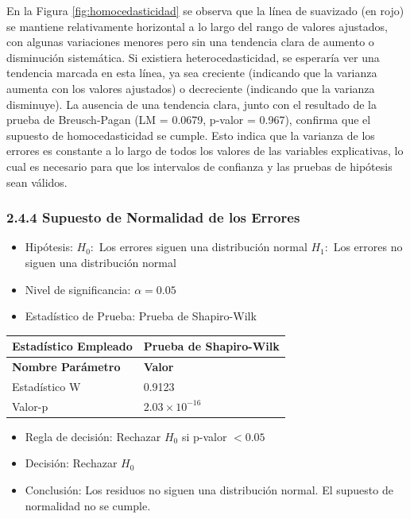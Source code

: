 \documentclass[12pt,a4paper]{article}
\begin{document}
En la Figura \ref{fig:homocedasticidad} se observa que la línea de suavizado (en rojo) se mantiene relativamente horizontal a lo largo del rango de valores ajustados, con algunas variaciones menores pero sin una tendencia clara de aumento o disminución sistemática. Si existiera heterocedasticidad, se esperaría ver una tendencia marcada en esta línea, ya sea creciente (indicando que la varianza aumenta con los valores ajustados) o decreciente (indicando que la varianza disminuye). La ausencia de una tendencia clara, junto con el resultado de la prueba de Breusch-Pagan (LM = 0.0679, p-valor = 0.967), confirma que el supuesto de homocedasticidad se cumple. Esto indica que la varianza de los errores es constante a lo largo de todos los valores de las variables explicativas, lo cual es necesario para que los intervalos de confianza y las pruebas de hipótesis sean válidos.

\subsubsection*{2.4.4 Supuesto de Normalidad de los Errores}

\begin{itemize}
    \item Hipótesis: \quad $H_0:$ Los errores siguen una distribución normal \hspace{2cm} $H_1:$ Los errores no siguen una distribución normal
    \item Nivel de significancia: $\alpha = 0.05$
    \item Estadístico de Prueba: Prueba de Shapiro-Wilk
\end{itemize}

\begin{tabular}{|m{7cm}|m{7cm}|}
\hline
\textbf{Estadístico Empleado} & Prueba de Shapiro-Wilk \\ \hline
\textbf{Nombre Parámetro} & \textbf{Valor} \\ \hline
Estadístico W & 0.9123 \\ \hline
Valor-p & $2.03 \times 10^{-16}$ \\ \hline
\end{tabular}

\begin{itemize}
    \item Regla de decisión: Rechazar $H_0$ si p-valor $< 0.05$
    \item Decisión: Rechazar $H_0$
    \item Conclusión: Los residuos no siguen una distribución normal. El supuesto de normalidad no se cumple.
\end{itemize}
\end{document}
